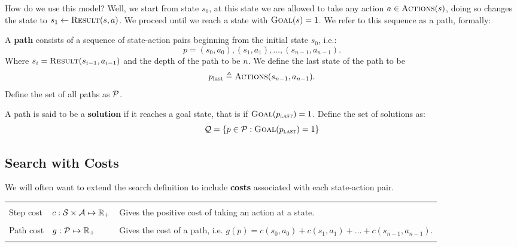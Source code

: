 \documentclass[11pt]{article}
\begin{document}
\air

\noindent How do we use this model? Well, we start from state $s_0$, at this state we are allowed to take 
any action $a \in \mathrm{\textsc{Actions}}(s)$, doing so changes the state to $s_1 \gets \mathrm{\textsc{Result}}(s, a)$. 
We proceed until we reach a state with $\mathrm{\textsc{Goal}}(s) = 1$. We refer to this sequence as a path, formally:



\begin{defn}
   A \textbf{path}
consists of a sequence of state-action pairs beginning from the initial state $s_0$, i.e.:  \[p = (s_0, a_0), (s_1, a_1), \ldots, (s_{n-1}, a_{n-1}).\] 
\noindent Where $s_i = \mathrm{\textsc{Result}}(s_{i-1}, a_{i-1})$ and the depth of the path to be $n$. We define the last state of the path to be  
 \[p_{\mathrm{last}} \triangleq \mathrm{\textsc{Actions}}(s_{n-1}, a_{n-1}).\] 
Define the set of all paths as $\mathcal{P}$.

\end{defn}

\begin{defn}
  A path is said to be a \textbf{solution} if it reaches a goal state, that is if $\mathrm{\textsc{Goal}}(p_{\mathrm{\textsc{last}}}) = 1$.
  Define the set of solutions as: 
  \[\mathcal{Q} = \{p \in \mathcal{P}:  \mathrm{\textsc{Goal}}(p_{\mathrm{\textsc{last}}}) = 1 \} \]
\end{defn}


\subsection{Search with Costs}

We will often want to extend the search definition to include \textbf{costs} associated with each state-action pair. 

\air

\begin{center}
\begin{tabularx}{\linewidth}{llX}
  \toprule
  \\
 Step cost & $c:\mathcal{S} \times \mathcal{A} \mapsto \mathbb{R}_+$ & Gives the positive cost of taking an action at a state. \\\\
 Path cost & $g:\mathcal{P}  \mapsto \mathbb{R}_+$ & Gives the cost of a path, i.e. $g(p) = c(s_0, a_0) +
c(s_1, a_1) + \ldots + c(s_{n-1}, a_{n-1})$. \\\\
\bottomrule
\end{tabularx}
\end{center}
\end{document}
